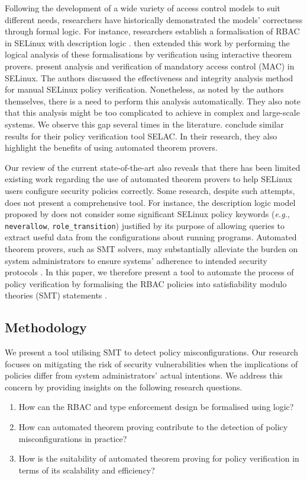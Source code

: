 \documentclass[acmsmall,screen,nonacm]{acmart}
\begin{document}
Following the development of a wide variety of access control models to suit 
different needs, researchers have historically demonstrated the models' 
correctness through formal logic. For instance, researchers establish a 
formalisation of RBAC in SELinux with description logic 
\cite{dickerson2006model}. \citet{rbac-isabelle} then extended this work by 
performing the logical analysis of these formalisations by verification using 
interactive theorem provers. \citet{JingBai} present analysis and verification 
of mandatory access control (MAC) in SELinux. The authors discussed the 
effectiveness and integrity analysis method for manual SELinux policy 
verification. Nonetheless, as noted by the authors themselves, there is a need 
to perform this analysis automatically. They also note that this analysis might 
be too complicated to achieve in complex and large-scale systems. We observe 
this gap several times in the literature. \citet{SELAC} conclude similar 
results for their policy verification tool SELAC. In their research, they also 
highlight the benefits of using automated theorem provers.

Our review of the current state-of-the-art also reveals that there has been 
limited existing work regarding the use of automated theorem provers to help 
SELinux users configure security policies correctly. Some research, despite 
such attempts, does not present a comprehensive tool. For instance, the 
description logic model proposed by \citet{dickerson2006model} does not 
consider some significant SELinux policy keywords (\textit{e.g.}, 
\texttt{neverallow}, \texttt{role\_transition}) justified by its purpose of 
allowing queries to extract useful data from the configurations about running 
programs. Automated theorem provers, such as SMT solvers, may substantially 
alleviate the burden on system administrators to ensure systems' adherence to 
intended security protocols \cite{automated-prover}. In this paper, we 
therefore present a tool to automate the process of policy verification by 
formalising the RBAC policies into satisfiability modulo theories (SMT) 
statements \cite{HandbookSatisfiability}.

\subsection{Methodology}

We present a tool utilising SMT to detect policy misconfigurations. Our 
research focuses on mitigating the risk of security vulnerabilities when the 
implications of policies differ from system administrators' actual intentions. 
We address this concern by providing insights on the following research 
questions.
\begin{enumerate}
    \item How can the RBAC and type enforcement design be formalised using 
logic?
    \item How can automated theorem proving contribute to the detection of 
policy misconfigurations in practice?
    \item How is the suitability of automated theorem proving for policy 
verification in terms of its scalability and efficiency?
\end{enumerate}
\end{document}
